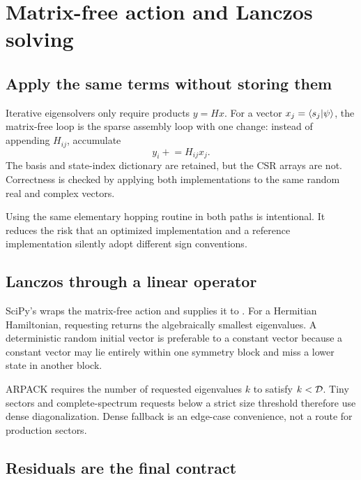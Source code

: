 \chapter{Matrix-free action and Lanczos solving}
\label{chap:lanczos}

\section{Apply the same terms without storing them}

Iterative eigensolvers only require products $y=Hx$.  For a vector
$x_j=\left\langle s_j \middle\vert \psi \right\rangle$, the matrix-free loop is the sparse assembly loop with
one change: instead of appending $H_{ij}$, accumulate
\begin{equation}
y_i \mathrel{+}= H_{ij}x_j.
\end{equation}
The basis and state-index dictionary are retained, but the CSR arrays are not.
Correctness is checked by applying both implementations to the same random
real and complex vectors.



Using the same elementary hopping routine in both paths is intentional.  It
reduces the risk that an optimized implementation and a reference
implementation silently adopt different sign conventions.

\section{Lanczos through a linear operator}

SciPy's  wraps the matrix-free action and supplies it to
.  For a Hermitian Hamiltonian, requesting
 returns the algebraically smallest eigenvalues.  A
deterministic random initial vector is preferable to a constant vector because
a constant vector may lie entirely within one symmetry block and miss a lower
state in another block.

ARPACK requires the number of requested eigenvalues $k$ to satisfy
$k<\mathcal{D}$.  Tiny sectors and complete-spectrum requests below a strict
size threshold therefore use dense diagonalization.  Dense fallback is an
edge-case convenience, not a route for production sectors.

\section{Residuals are the final contract}

